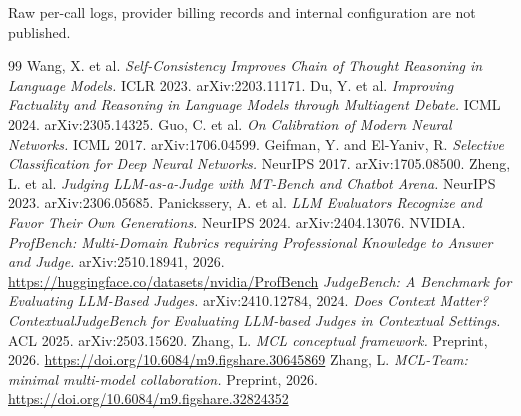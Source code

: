 \documentclass[
]{article}
\providecommand{\tightlist}{%
  \setlength{\itemsep}{0pt}\setlength{\parskip}{0pt}}
\begin{document}
Raw per-call logs, provider billing records and internal configuration are not
published.

\begin{thebibliography}{99}
\tightlist
{}
  Wang, X. et al. \emph{Self-Consistency Improves Chain of Thought Reasoning in Language Models.} ICLR 2023. arXiv:2203.11171.
  Du, Y. et al. \emph{Improving Factuality and Reasoning in Language Models through Multiagent Debate.} ICML 2024. arXiv:2305.14325.
  Guo, C. et al. \emph{On Calibration of Modern Neural Networks.} ICML 2017. arXiv:1706.04599.
  Geifman, Y. and El-Yaniv, R. \emph{Selective Classification for Deep Neural Networks.} NeurIPS 2017. arXiv:1705.08500.
  Zheng, L. et al. \emph{Judging LLM-as-a-Judge with MT-Bench and Chatbot Arena.} NeurIPS 2023. arXiv:2306.05685.
  Panickssery, A. et al. \emph{LLM Evaluators Recognize and Favor Their Own Generations.} NeurIPS 2024. arXiv:2404.13076.
  NVIDIA. \emph{ProfBench: Multi-Domain Rubrics requiring Professional Knowledge to Answer and Judge.} arXiv:2510.18941, 2026. \url{https://huggingface.co/datasets/nvidia/ProfBench}
  \emph{JudgeBench: A Benchmark for Evaluating LLM-Based Judges.} arXiv:2410.12784, 2024.
  \emph{Does Context Matter? ContextualJudgeBench for Evaluating LLM-based Judges in Contextual Settings.} ACL 2025. arXiv:2503.15620.
  Zhang, L. \emph{MCL conceptual framework.} Preprint, 2026. \url{https://doi.org/10.6084/m9.figshare.30645869}
  Zhang, L. \emph{MCL-Team: minimal multi-model collaboration.} Preprint, 2026. \url{https://doi.org/10.6084/m9.figshare.32824352}
\end{thebibliography}
\end{document}

